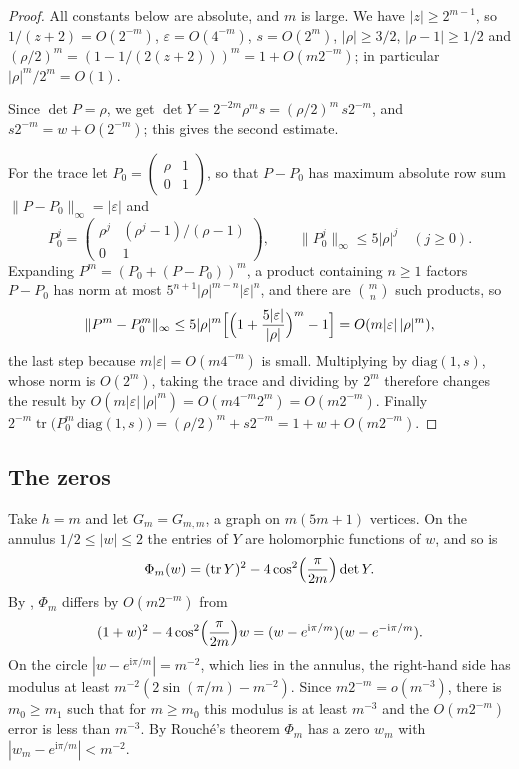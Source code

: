 \documentclass[11pt]{article}
\theoremstyle{remark}
\newcommand{\tr}{\operatorname{tr}}
\begin{document}
\begin{proof}
All constants below are absolute, and $m$ is large. We have $|z|\ge2^{m-1}$, so $1/(z+2)=O(2^{-m})$,
$\varepsilon=O(4^{-m})$, $s=O(2^m)$, $|\rho|\ge3/2$, $|\rho-1|\ge1/2$ and $(\rho/2)^m=(1-1/(2(z+2)))^m=1+O(m2^{-m})$; in
particular $|\rho|^m/2^m=O(1)$.

Since $\det P=\rho$, we get $\det Y=2^{-2m}\rho^ms=(\rho/2)^m\,s2^{-m}$, and $s2^{-m}=w+O(2^{-m})$; this gives the second
estimate.

For the trace let $P_0=\begin{pmatrix}\rho&1\\0&1\end{pmatrix}$, so that $P-P_0$ has maximum absolute row sum
$\|P-P_0\|_\infty=|\varepsilon|$ and
\[
P_0^j=\begin{pmatrix}\rho^j&(\rho^j-1)/(\rho-1)\\0&1\end{pmatrix},\qquad\|P_0^j\|_\infty\le5|\rho|^j\quad(j\ge0).
\]
Expanding $P^m=(P_0+(P-P_0))^m$, a product containing $n\ge1$ factors $P-P_0$ has norm at most
$5^{n+1}|\rho|^{m-n}|\varepsilon|^n$, and there are $\binom mn$ such products, so
\[
\|P^m-P_0^m\|_\infty\le5|\rho|^m\Bigl[\Bigl(1+\frac{5|\varepsilon|}{|\rho|}\Bigr)^m-1\Bigr]=O(m|\varepsilon|\,|\rho|^m),
\]
the last step because $m|\varepsilon|=O(m4^{-m})$ is small. Multiplying by $\mathrm{diag}(1,s)$, whose norm is
$O(2^m)$, taking the trace and dividing by $2^m$ therefore changes the result by
$O(m|\varepsilon|\,|\rho|^m)=O(m4^{-m}2^m)=O(m2^{-m})$. Finally
$2^{-m}\tr\bigl(P_0^m\,\mathrm{diag}(1,s)\bigr)=(\rho/2)^m+s2^{-m}=1+w+O(m2^{-m})$.
\end{proof}

\subsection{The zeros}

Take $h=m$ and let $G_m=G_{m,m}$, a graph on $m(5m+1)$ vertices. On the annulus $1/2\le|w|\le2$ the entries of $Y$
are holomorphic functions of $w$, and so is
\[
\Phi_m(w)=(\tr Y)^2-4\cos^2\Bigl(\frac\pi{2m}\Bigr)\det Y .
\]
By , $\Phi_m$ differs by $O(m2^{-m})$ from
\[
(1+w)^2-4\cos^2\Bigl(\frac\pi{2m}\Bigr)w=(w-e^{\mathrm i\pi/m})(w-e^{-\mathrm i\pi/m}).
\]
On the circle $|w-e^{\mathrm i\pi/m}|=m^{-2}$, which lies in the annulus, the right-hand side has modulus at least
$m^{-2}(2\sin(\pi/m)-m^{-2})$. Since $m2^{-m}=o(m^{-3})$, there is $m_0\ge m_1$ such that for $m\ge m_0$ this modulus
is at least $m^{-3}$ and the $O(m2^{-m})$ error is less than $m^{-3}$. By Rouch\'e's theorem $\Phi_m$ has a
zero $w_m$ with $|w_m-e^{\mathrm i\pi/m}|<m^{-2}$.
\end{document}
